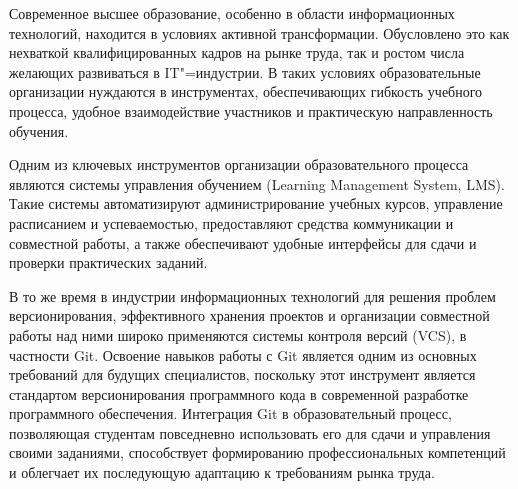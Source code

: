 \documentclass[coursework]{SCWorks}
\begin{document}

\date{2026}

\maketitle

\secNumbering

\tableofcontents




\intro

Современное высшее образование, особенно в области информационных технологий, находится в условиях активной трансформации. Обусловлено это как нехваткой квалифицированных кадров на рынке труда, так и ростом числа желающих развиваться в IT"=индустрии. В таких условиях образовательные организации нуждаются в инструментах, обеспечивающих гибкость учебного процесса, удобное взаимодействие участников и практическую направленность обучения.

Одним из ключевых инструментов организации образовательного процесса являются системы управления обучением (Learning Management System, LMS). Такие системы автоматизируют администрирование учебных курсов, управление расписанием и успеваемостью, предоставляют средства коммуникации и совместной работы, а также обеспечивают удобные интерфейсы для сдачи и проверки практических заданий.

В то же время в индустрии информационных технологий для решения проблем версионирования, эффективного хранения проектов и организации совместной работы над ними широко применяются системы контроля версий (VCS), в частности Git. Освоение навыков работы с Git является одним из основных требований для будущих специалистов, поскольку этот инструмент является стандартом версионирования программного кода в современной разработке программного обеспечения. Интеграция Git в образовательный процесс, позволяющая студентам повседневно использовать его для сдачи и управления своими заданиями, способствует формированию профессиональных компетенций и облегчает их последующую адаптацию к требованиям рынка труда.
\end{document}
